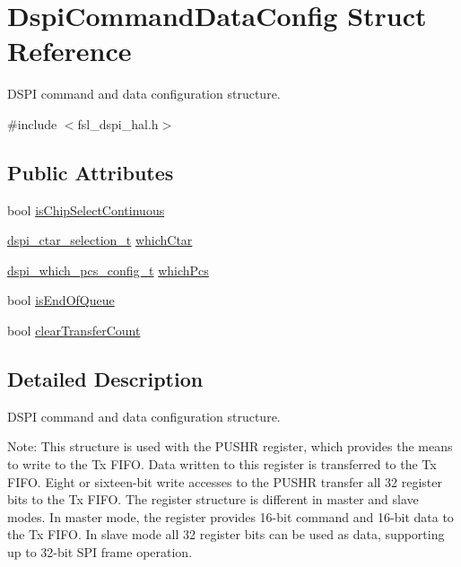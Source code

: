 \hypertarget{structDspiCommandDataConfig}{}\section{Dspi\+Command\+Data\+Config Struct Reference}
\label{structDspiCommandDataConfig}


D\+S\+PI command and data configuration structure.  




{\ttfamily \#include $<$fsl\+\_\+dspi\+\_\+hal.\+h$>$}

\subsection*{Public Attributes}
\begin{DoxyCompactItemize}
\item 
bool \hyperlink{structDspiCommandDataConfig_a7d50d6a3cca29e69ce757ea1a0f0bce5}{is\+Chip\+Select\+Continuous}
\item 
\hyperlink{group__dspi__hal_ga8d2c04fe9fd119bdcc613f4c35095721}{dspi\+\_\+ctar\+\_\+selection\+\_\+t} \hyperlink{structDspiCommandDataConfig_abedde50b4a95ebfb8475cbdd64875447}{which\+Ctar}
\item 
\hyperlink{group__dspi__hal_ga5377cd155b68bf00351fff6e58230062}{dspi\+\_\+which\+\_\+pcs\+\_\+config\+\_\+t} \hyperlink{structDspiCommandDataConfig_ab8a264f828371aabec0a9a08097c14dd}{which\+Pcs}
\item 
bool \hyperlink{structDspiCommandDataConfig_a1c1b72544deeae3cd733e5c66fc9da4b}{is\+End\+Of\+Queue}
\item 
bool \hyperlink{structDspiCommandDataConfig_ad820da8c6cbf602b707588cf53f8b36a}{clear\+Transfer\+Count}
\end{DoxyCompactItemize}


\subsection{Detailed Description}
D\+S\+PI command and data configuration structure. 

Note\+: This structure is used with the P\+U\+S\+HR register, which provides the means to write to the Tx F\+I\+FO. Data written to this register is transferred to the Tx F\+I\+FO. Eight or sixteen-\/bit write accesses to the P\+U\+S\+HR transfer all 32 register bits to the Tx F\+I\+FO. The register structure is different in master and slave modes. In master mode, the register provides 16-\/bit command and 16-\/bit data to the Tx F\+I\+FO. In slave mode all 32 register bits can be used as data, supporting up to 32-\/bit S\+PI frame operation. 


